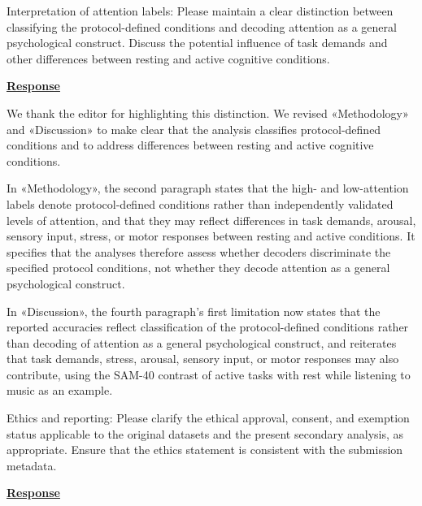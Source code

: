 \documentclass{article}
\begin{document}
\begin{cmt}{}{}

Interpretation of attention labels: Please maintain a clear distinction between
classifying the protocol-defined conditions and decoding attention as a general
psychological construct. Discuss the potential influence of task demands and
other differences between resting and active cognitive conditions.

\end{cmt}
\vspace{0.1cm}
\noindent
\underline{\textbf{Response}}
\vspace{0.2cm}

We thank the editor for highlighting this distinction. We revised
«Methodology» and «Discussion» to make clear that the analysis classifies
protocol-defined conditions and to address differences between resting and
active cognitive conditions.

In «Methodology», the second paragraph states that the high- and
low-attention labels denote protocol-defined conditions rather than
independently validated levels of attention, and that they may reflect
differences in task demands, arousal, sensory input, stress, or motor
responses between resting and active conditions. It specifies that the
analyses therefore assess whether decoders discriminate the specified
protocol conditions, not whether they decode attention as a general
psychological construct.

In «Discussion», the fourth paragraph's first limitation now states that the
reported accuracies reflect classification of the protocol-defined
conditions rather than decoding of attention as a general psychological
construct, and reiterates that task demands, stress, arousal, sensory input,
or motor responses may also contribute, using the SAM-40 contrast of active
tasks with rest while listening to music as an example.

\vspace{0.3cm}


\begin{cmt}{}{}

Ethics and reporting: Please clarify the ethical approval, consent, and
exemption status applicable to the original datasets and the present secondary
analysis, as appropriate. Ensure that the ethics statement is consistent with
the submission metadata.

\end{cmt}
\vspace{0.1cm}
\noindent
\underline{\textbf{Response}}
\vspace{0.2cm}
\end{document}
